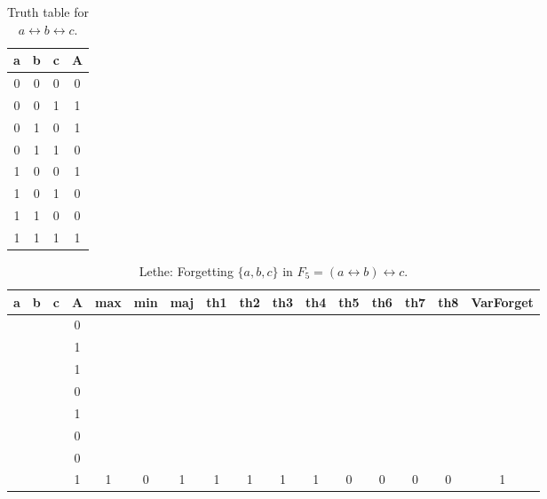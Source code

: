 \begin{table}[!tb]
    \centering
    \begin{tabular}{|c|c|c|c|}
        \hline
        \textbf{a} & \textbf{b} & \textbf{c} & \textbf{A} \\ \hline
        0 & 0 & 0 & 0 \\ \hline
        0 & 0 & 1 & 1 \\ \hline
        0 & 1 & 0 & 1 \\ \hline
        0 & 1 & 1 & 0 \\ \hline
        1 & 0 & 0 & 1 \\ \hline
        1 & 0 & 1 & 0 \\ \hline
        1 & 1 & 0 & 0 \\ \hline
        1 & 1 & 1 & 1 \\ \hline
    \end{tabular}
    \caption{Truth table for $a \leftrightarrow b \leftrightarrow c$.}
    \label{tab:truthtab}
\end{table}

\begin{table}[!tb]
    \centering
    \begin{tabular}{|c|c|c|c|c|c|c|c|c|c|c|c|c|c|c|c|}
        \hline
        \textbf{a} & \textbf{b} & \textbf{c} & \textbf{A} & \textbf{max} & \textbf{min} & \textbf{maj} & \textbf{th1} & \textbf{th2} & \textbf{th3} & \textbf{th4} & \textbf{th5} & \textbf{th6} & \textbf{th7} & \textbf{th8} & \textbf{VarForget} \\ \hline
        \rowcolor{gray!40}  &  &  & 0 &  &  &  &  &  &  &  &  &  &  &  &  \\ \hline
        \rowcolor{gray!40}  &  &  & 1 &  &  &  &  &  &  &  &  &  &  &  &  \\ \hline
        \rowcolor{gray!40}  &  &  & 1 &  &  &  &  &  &  &  &  &  &  &  &  \\ \hline
        \rowcolor{gray!40}  &  &  & 0 &  &  &  &  &  &  &  &  &  &  &  &  \\ \hline
        \rowcolor{gray!40}  &  &  & 1 &  &  &  &  &  &  &  &  &  &  &  &  \\ \hline
        \rowcolor{gray!40}  &  &  & 0 &  &  &  &  &  &  &  &  &  &  &  &  \\ \hline
        \rowcolor{gray!40}  &  &  & 0 &  &  &  &  &  &  &  &  &  &  &  &  \\ \hline
        \rowcolor{gray!40}  &  &  & 1 & 1 & 0 & 1 & 1 & 1 & 1 & 1 & 0 & 0 & 0 & 0 & 1 \\ \hline
    \end{tabular}
    \caption{Lethe: Forgetting $\{a, b, c\}$ in $F_{5} = (a \leftrightarrow b) \leftrightarrow c$.}
    \label{tab:lethe-F5-abc}
\end{table}

